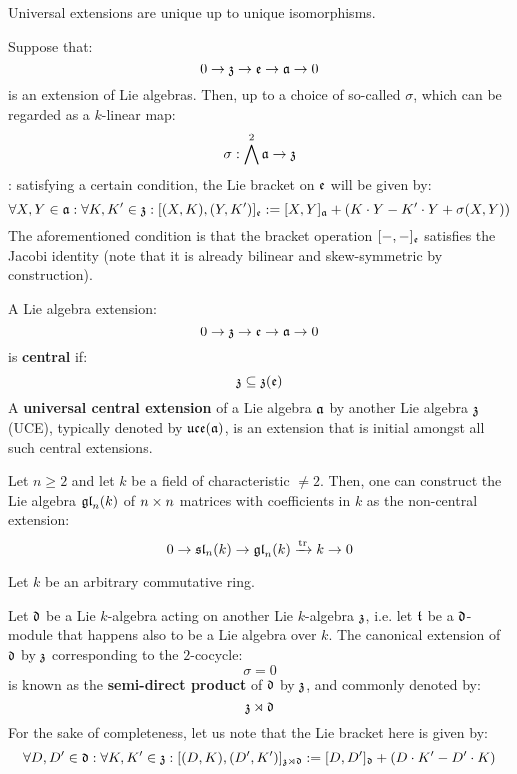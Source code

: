         \begin{remark}
            Universal extensions are unique up to unique isomorphisms. 
        \end{remark}
        \begin{remark}
            Suppose that:
                $$0 \to \mathfrak{z} \to \mathfrak{e} \to \mathfrak{a} \to 0$$
            is an extension of Lie algebras. Then, up to a choice of so-called  $\sigma$, which can be regarded as a $k$-linear map:
                $$\sigma: \bigwedge^2 \mathfrak{a} \to \mathfrak{z}$$:
            satisfying a certain condition, the Lie bracket on $\mathfrak{e}$ will be given by:
                $$\forall X, Y \in \mathfrak{a}: \forall K, K' \in \mathfrak{z}: [ (X, K), (Y, K') ]_{\mathfrak{e}} := [X, Y]_{\mathfrak{a}} + ( K \cdot Y - K' \cdot Y + \sigma(X, Y) )$$
            The aforementioned condition is that the bracket operation $[-, -]_{\mathfrak{e}}$ satisfies the Jacobi identity (note that it is already bilinear and skew-symmetric by construction).
        \end{remark}
        \begin{definition}
            A Lie algebra extension:
                $$0 \to \mathfrak{z} \to \mathfrak{e} \to \mathfrak{a} \to 0$$
            is \textbf{central} if:
                $$\mathfrak{z} \subseteq \mathfrak{z}(\mathfrak{e})$$
            A \textbf{universal central extension} of a Lie algebra $\mathfrak{a}$ by another Lie algebra $\mathfrak{z}$ (UCE), typically denoted by $\mathfrak{uce}(\mathfrak{a})$, is an extension that is initial amongst all such central extensions.
        \end{definition}
        \begin{example}
            Let $n \geq 2$ and let $k$ be a field of characteristic $\not = 2$. Then, one can construct the Lie algebra $\mathfrak{gl}_n(k)$ of $n \x n$ matrices with coefficients in $k$ as the non-central extension:
                $$0 \to \mathfrak{sl}_n(k) \to \mathfrak{gl}_n(k) \xrightarrow[]{\operatorname{tr}} k \to 0$$
        \end{example}
        \begin{example}
            Let $k$ be an arbitrary commutative ring. 
            
            Let $\mathfrak{d}$ be a Lie $k$-algebra acting on another Lie $k$-algebra $\mathfrak{z}$, i.e. let $\mathfrak{t}$ be a $\mathfrak{d}$-module that happens also to be a Lie algebra over $k$. The canonical extension of $\mathfrak{d}$ by $\mathfrak{z}$ corresponding to the $2$-cocycle:
                $$\sigma = 0$$
            is known as the \textbf{semi-direct product} of $\mathfrak{d}$ by $\mathfrak{z}$, and commonly denoted by:
                $$\mathfrak{z} \rtimes \mathfrak{d}$$
            For the sake of completeness, let us note that the Lie bracket here is given by:
                $$\forall D, D' \in \mathfrak{d}: \forall K, K' \in \mathfrak{z}: [ (D, K), (D', K') ]_{\mathfrak{z} \rtimes \mathfrak{d}} := [D, D']_{\mathfrak{d}} + ( D \cdot K' - D' \cdot K )$$
        \end{example}


